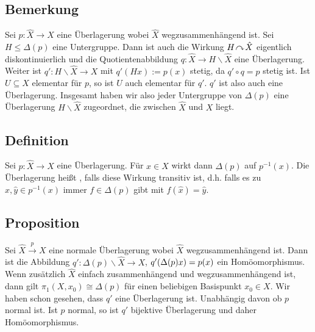 \subsection{Bemerkung} %
\label{sub:12.8}
\begin{figure}
\end{figure}
Sei $p : \hat{X} \to X$ eine Überlagerung wobei $\hat{X}$ wegzusammenhängend ist. Sei $H \le \Delta(p)$ eine Untergruppe. Dann ist auch die Wirkung $H \!\curvearrowright\! \hat{X}$
eigentlich diskontinuierlich und die Quotientenabbildung $q : \hat{X} \to H \backslash \hat{X}$ eine Überlagerung. Weiter ist $q' : H \backslash \hat{X} \to X$ mit
$q'(Hx) := p(x)$ stetig, da $q' \circ q = p$ stetig ist. Ist $U \subseteq X$ elementar für $p$, so ist $U$ auch elementar für $q'$. $q'$ ist also auch eine Überlagerung.
Insgesamt haben wir also jeder Untergruppe von $\Delta (p)$ eine Überlagerung $H \backslash \hat{X}$ zugeordnet, die zwischen $\hat{X}$ und $X$ liegt.

\subsection[Definition: Normale Überlagerung]{Definition} %
\label{sub:12.9}
Sei $p : \hat{X} \to X$ eine Überlagerung. Für $x \in X$ wirkt dann $\Delta(p)$ auf $p^{-1}(x)$. Die Überlagerung heißt 
, falls diese Wirkung transitiv ist, d.h. falls es zu $\hat{x}, \hat{y} \in p^{-1}(x)$ immer $f \in \Delta(p)$ gibt mit 
$f(\hat{x})= \hat{y}$.

\subsection{Proposition} %
\label{sub:1210}
Sei $\hat{X} \xrightarrow{p} X $ eine normale Überlagerung wobei $\hat{X}$ wegzusammenhängend ist. Dann ist die Abbildung $q' : \Delta(p)\backslash \hat{X} \to X$,
$q' \enbrace*{\Delta(p) x} = p(x)$ ein Homöomorphismus. \\
Wenn zusätzlich $\hat{X}$ einfach zusammenhängend und wegzusammenhängend ist, dann gilt $\pi_1(X, x_0) \cong \Delta(p)$ für einen beliebigen Basispunkt $x_0 \in X$.
Wir haben schon gesehen, dass $q'$ eine Überlagerung ist. Unabhängig davon ob $p$ normal ist. Ist $p$ normal, so ist $q'$ bijektive Überlagerung und daher Homöomorphismus.
\bewende 
\newpage


